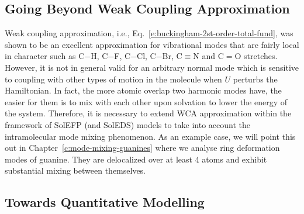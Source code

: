 \documentclass[a4paper,titlepage,twoside,fleqn,12pt]{book}
\begin{document}
\begin{refsection}
\section{Going Beyond Weak Coupling Approximation\label{s:beyond-wca}}

Weak coupling approximation, i.e., Eq.~\eqref{e:buckingham-2st-order-total-fund},
was shown to be an excellent approximation
for vibrational modes that are fairly local in character
such as C$-$H, C$-$F, C$-$Cl, C$-$Br, C$\equiv$N and C$=$O stretches. However, it
is not in general valid for an arbitrary normal mode
which is sensitive to coupling with other types of motion
in the molecule when $U$ perturbs the Hamiltonian.
In fact, the more atomic overlap two harmonic modes have,
the easier for them is to mix with each other
upon solvation to lower the energy
of the system. 
Therefore, it is necessary to extend WCA approximation
within the framework of SolEFP (and SolEDS) models
to take into account the intramolecular mode mixing
phenomenon. As an example case, we will point this out
in Chapter~\ref{c:mode-mixing-guanines} 
where we analyse ring deformation modes
of guanine. They are delocalized over at least 4 atoms
and exhibit substantial mixing between themselves.

\subsection{Towards Quantitative Modelling}


\end{refsection}
\end{document}

